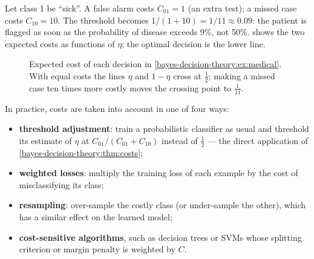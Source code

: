 \begin{notechapter}
\begin{example}\label{bayes-decision-theory:ex:medical}
Let class 1 be ``sick''. A false alarm costs $C_{01} = 1$ (an extra test); a
missed case costs $C_{10} = 10$. The threshold becomes
$1/(1 + 10) = 1/11 \approx 0.09$: the patient is flagged as soon as the
probability of disease exceeds 9\%, not 50\%.
 shows the two expected costs as
functions of $\eta$; the optimal decision is the lower line.
\end{example}

\begin{figure}[ht]
\centering
{}
\caption{Expected cost of each decision in \cref{bayes-decision-theory:ex:medical}.
With equal costs the lines $\eta$ and $1-\eta$ cross at $\frac12$; making a
missed case ten times more costly moves the crossing point to $\frac1{11}$.}
\label{bayes-decision-theory:fig:costs}
\end{figure}

In practice, costs are taken into account in one of four ways:
\begin{itemize}
  \item \textbf{threshold adjustment}: train a probabilistic classifier as
        usual and threshold its estimate of $\eta$ at
        $C_{01}/(C_{01}+C_{10})$ instead of $\frac12$ --- the direct
        application of \cref{bayes-decision-theory:thm:costs};
  \item \textbf{weighted losses}: multiply the training loss of each example
        by the cost of misclassifying its class;
  \item \textbf{resampling}: over-sample the costly class (or under-sample the
        other), which has a similar effect on the learned model;
  \item \textbf{cost-sensitive algorithms}, such as decision trees or SVMs
        whose splitting criterion or margin penalty is weighted by $C$.
\end{itemize}


\end{notechapter}
